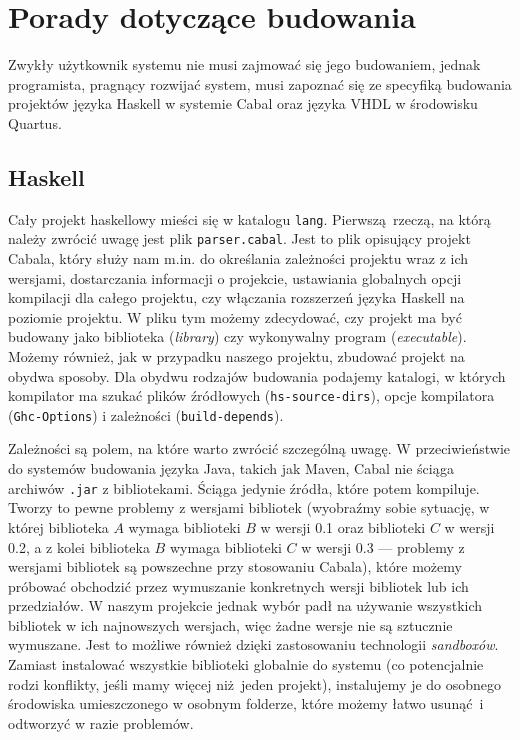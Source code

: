 \section{Porady dotyczące budowania}

Zwykły użytkownik systemu nie musi zajmować się jego budowaniem, jednak programista, pragnący rozwijać system, musi zapoznać się ze specyfiką budowania projektów języka Haskell w systemie Cabal oraz języka VHDL w środowisku Quartus.

\subsection{Haskell}
Cały projekt haskellowy mieści się w katalogu \texttt{lang}. Pierwszą rzeczą, na którą należy zwrócić uwagę jest plik \texttt{parser.cabal}. Jest to plik opisujący projekt Cabala, który służy nam m.in. do określania zależności projektu wraz z ich wersjami, dostarczania informacji o projekcie, ustawiania globalnych opcji kompilacji dla całego projektu, czy włączania rozszerzeń języka Haskell na poziomie projektu. W pliku tym możemy zdecydować, czy projekt ma być budowany jako biblioteka (\textit{library}) czy wykonywalny program (\textit{executable}). Możemy również, jak w przypadku naszego projektu, zbudować projekt na obydwa sposoby. Dla obydwu rodzajów budowania podajemy katalogi, w których kompilator ma szukać plików źródłowych (\texttt{hs-source-dirs}), opcje kompilatora (\texttt{Ghc-Options}) i zależności (\texttt{build-depends}).

Zależności są polem, na które warto zwrócić szczególną uwagę. W przeciwieństwie do systemów budowania języka Java, takich jak Maven, Cabal nie ściąga archiwów \texttt{.jar} z bibliotekami. Ściąga jedynie źródła, które potem kompiluje. Tworzy to pewne problemy z wersjami bibliotek (wyobraźmy sobie sytuację, w której biblioteka $A$ wymaga biblioteki $B$ w wersji 0.1 oraz biblioteki $C$ w wersji 0.2, a z kolei biblioteka $B$ wymaga biblioteki $C$ w wersji 0.3 --- problemy z wersjami bibliotek są powszechne przy stosowaniu Cabala), które możemy próbować obchodzić przez wymuszanie konkretnych wersji bibliotek lub ich przedziałów. W naszym projekcie jednak wybór padł na używanie wszystkich bibliotek w ich najnowszych wersjach, więc żadne wersje nie są sztucznie wymuszane. Jest to możliwe również dzięki zastosowaniu technologii \textit{sandboxów}. Zamiast instalować wszystkie biblioteki globalnie do systemu (co potencjalnie rodzi konflikty, jeśli mamy więcej niż jeden projekt), instalujemy je do osobnego środowiska umieszczonego w osobnym folderze, które możemy łatwo usunąć i odtworzyć w razie problemów.

